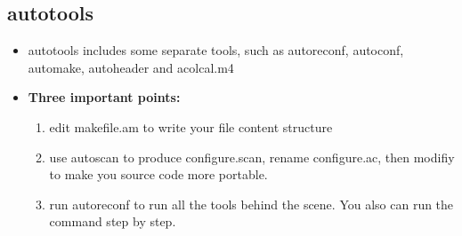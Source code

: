 \documentclass[paper=8.5in:11in, twoside, 12pt, pagesize=pdftex]{book}
\begin{document}
\subsection{autotools}
\begin{itemize}
		\item autotools includes some separate tools, such as autoreconf, autoconf, automake, autoheader and acolcal.m4 
		
		\item \textbf{Three important points:}
				\begin{enumerate}
						\item edit makefile.am to write your file content structure
						\item use autoscan to produce configure.scan, rename configure.ac, then modifiy to make you source code more portable. 
						
						\item run autoreconf to run all the tools behind the scene. You also can run the command step by step.
				\end{enumerate}
		

\end{itemize}
\end{document}
